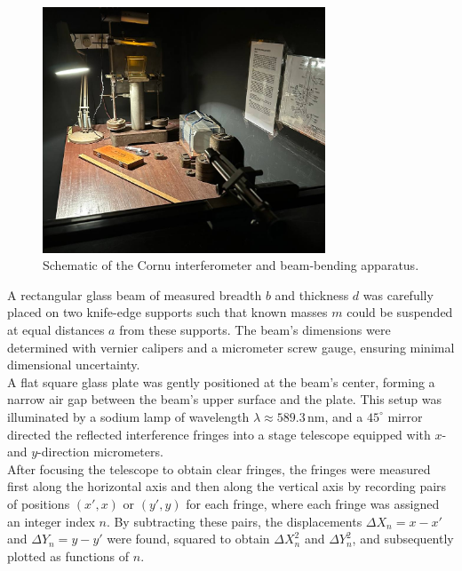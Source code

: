 \documentclass[a4paper,11pt]{article}
\begin{document}
\begin{figure}[H]
  \centering
  \includegraphics[width=0.75\textwidth]{image.png}
  \caption{Schematic of the Cornu interferometer and beam‑bending apparatus.}
  \label{fig:setup}
\end{figure}

A rectangular glass beam of measured breadth \(b\) and thickness \(d\) was carefully placed on two knife-edge supports such that known masses \(m\) could be suspended at equal distances \(a\) from these supports. The beam's dimensions were determined with vernier calipers and a micrometer screw gauge, ensuring minimal dimensional uncertainty.\\

A flat square glass plate was gently positioned at the beam's center, forming a narrow air gap between the beam's upper surface and the plate. This setup was illuminated by a sodium lamp of wavelength \(\lambda \approx 589.3\,\mathrm{nm}\), and a \(45^\circ\) mirror directed the reflected interference fringes into a stage telescope equipped with \(x\)- and \(y\)-direction micrometers.\\

After focusing the telescope to obtain clear fringes, the fringes were measured first along the horizontal axis and then along the vertical axis by recording pairs of positions \((x',x)\) or \((y',y)\) for each fringe, where each fringe was assigned an integer index \(n\). By subtracting these pairs, the displacements \(\Delta X_n = x - x'\) and \(\Delta Y_n = y - y'\) were found, squared to obtain \(\Delta X_n^2\) and \(\Delta Y_n^2\), and subsequently plotted as functions of \(n\).\\
\end{document}

